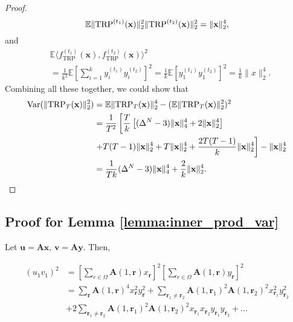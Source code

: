 \begin{proof}
\begin{equation}
\mathbb{E} \|\textup{TRP}^{(t_1)}(\mathbf{x})\|^2_2\|\textup{TRP}^{(t_2)}(\mathbf{x})\|^2_2= \|\mathbf{x}\|_2^4, \nonumber 
\end{equation}
and 
\begin{equation}
\begin{aligned}
&\mathbb{E} \langle f^{(t_1)}_{\text{TRP}}(\mathbf{x}), f^{(t_2)}_{\text{TRP}}(\mathbf{x}) \rangle^2\\ &=\frac{1}{k^2} \mathbb{E} \left[ \sum_{i=1}^k y^{(t_1)}_i y^{(t_2)}_i \right]^2 = \frac{1}{k}  \mathbb{E} [y^{(t_1)}_1 y^{(t_2)}_1]^2 = \frac{1}{k}\|x\|_2^4. \nonumber 
\end{aligned}
\end{equation}
Combining all these together, we could show that 
\begin{equation}
\begin{aligned}
\textrm{Var}(\|\textup{TRP}_T(\mathbf{x})\|_2^2) &= \mathbb{E}\|\textup{TRP}_T(\mathbf{x})\|^4_2 -  (\mathbb{E}\|\textup{TRP}_T(\mathbf{x})\|^2_2)^2\\ 
&= \frac{1}{T^2} \left[ \frac{T}{k}\left[(\Delta^N-3)\|\mathbf{x}\|_4^4 +2\|\mathbf{x}\|_2^4 \right]\right.\\
&\left. +T(T-1)\|\mathbf{x}\|_2^4+T\|\mathbf{x}\|_2^4+\frac{2T(T-1)}{k}\|\mathbf{x}\|_2^4 \right] - \|\mathbf{x}\|_2^4 \\ 
&= \frac{1}{Tk}(\Delta^N-3)\|\mathbf{x}\|_4^4 + \frac{2}{k}\|\mathbf{x}\|_2^4. \nonumber
\end{aligned}
\end{equation}
\end{proof}

\subsection*{Proof for Lemma \ref{lemma:inner_prod_var}} 
Let $\mathbf{u} = \mathbf{A}\mathbf{x}$, $\mathbf{v} = \mathbf{A}\mathbf{y}$. Then,  

\begin{equation}
\begin{aligned}
(u_1 v_1)^2 &= [\sum_{r \in \Omega} \mathbf{A}(1,\mathbf{r}) x_\mathbf{r}]^2 [\sum_{r \in \Omega} \mathbf{A}(1,\mathbf{r}) 
y_\mathbf{r}]^2 \\  
&= \sum_{\mathbf{r}} \mathbf{A}(1,\mathbf{r})^4 x_{\mathbf{r}}^2 y_{\mathbf{r}}^2 +
 \sum_{\mathbf{r}_1 \neq \mathbf{r}_2} \mathbf{A}(1, \mathbf{r}_1)^2 \mathbf{A}(1, \mathbf{r}_2)^2 x_{\mathbf{r}_1}^2 y_{\mathbf{r}_2}^2 \\
&+ 2\sum_{\mathbf{r}_1 \neq \mathbf{r}_2 } \mathbf{A}(1, \mathbf{r}_1)^2 \mathbf{A}(1, \mathbf{r}_2)^2 x_{\mathbf{r}_1} x_{\mathbf{r}_2} y_{\mathbf{r}_1} y_{\mathbf{r}_2} + \dots \\ 
\end{aligned}
\end{equation} 

